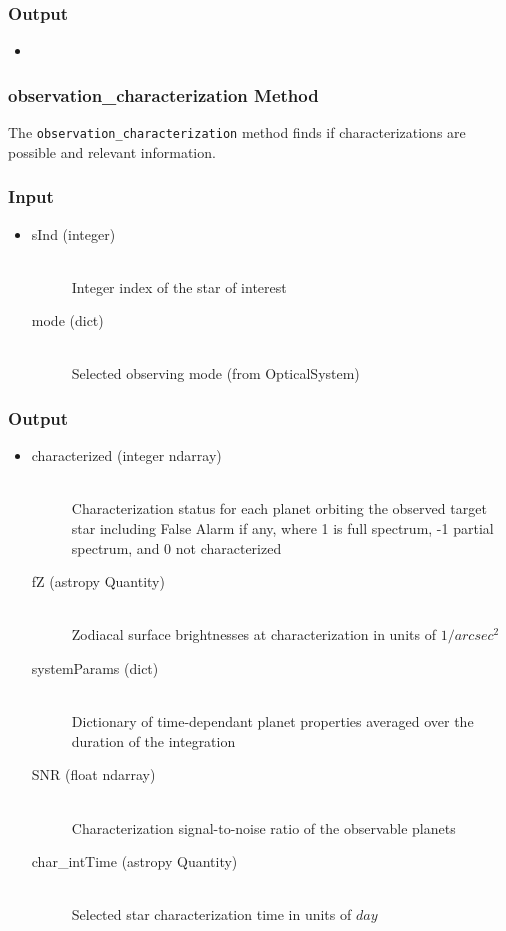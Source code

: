 \documentclass[cleanfoot]{asme2ej}
\begin{document}
\subsubsection*{Output}
\begin{itemize}
\item 
{}
\end{itemize}

\subsubsection{observation\_characterization Method} \label{sec:observationcharacterizationtask}
The \verb+observation_characterization+ method finds if characterizations are possible and relevant information.
\subsubsection*{Input}
\begin{itemize}
\item
\begin{description}
    \item[sInd (integer)] \hfill \\ Integer index of the star of interest
    \item[mode (dict)] \hfill \\ Selected observing mode (from OpticalSystem)
\end{description}
\end{itemize}
\subsubsection*{Output}
\begin{itemize}
\item
\begin{description}
    \item[characterized (integer ndarray)] \hfill \\ Characterization status for each planet orbiting the observed target star including False Alarm if any, where 1 is full spectrum, -1 partial spectrum, and 0 not characterized
    \item[fZ (astropy Quantity)] \hfill \\ Zodiacal surface brightnesses at characterization in units of $1/arcsec^2$
    \item[systemParams (dict)] \hfill \\ Dictionary of time-dependant planet properties averaged over the duration of the integration
    \item[SNR (float ndarray)] \hfill \\ Characterization signal-to-noise ratio of the observable planets
    \item[char\_intTime (astropy Quantity)] \hfill \\ Selected star characterization time in units of $day$
\end{description}
\end{itemize}
\end{document}
